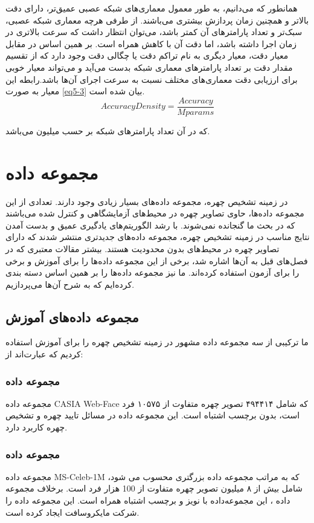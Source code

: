 \noindent
همانطور که می‌دانیم، به طور معمول معماری‌های شبکه عصبی عمیق‌تر، دارای دقت بالاتر و همچنین زمان پردازش بیشتری می‌باشند. از طرفی هرچه معماری شبکه عصبی، سبک‌تر و تعداد پارامترهای آن کمتر باشد، می‌توان انتظار داشت که سرعت بالاتری در زمان اجرا داشته باشد، اما دقت آن با کاهش همراه است. بر همین اساس در مقابل معیار دقت، معیار دیگری به نام تراکم دقت یا چگالی دقت  وجود دارد که از تقسیم مقدار دقت بر تعداد پارامترهای معماری شبکه بدست می‌آید و می‌تواند معیار خوبی برای ارزیابی دقت معماری‌های مختلف نسبت به سرعت اجرای آن‌ها باشد.رابطه این معیار به صورت \ref{eq5-3} بیان شده است.
‌\begin{equation}\label{eq5-3}
Accuracy Density = \frac{Accuracy}{Mparams}
\end{equation}

\noindent
که در آن  تعداد پارامترهای شبکه بر حسب میلیون می‌باشد.

\section{مجموعه داده}
در زمینه تشخیص چهره، مجموعه داده‌های بسیار زیادی وجود دارند. تعدادی از این مجموعه داده‌ها، حاوی تصاویر چهره در محیط‌های آزمایشگاهی و کنترل شده می‌باشند که در بحث ما گنجانده نمی‌شوند. با رشد الگوریتم‌های یادگیری عمیق و بدست آمدن نتایج مناسب در زمینه تشخیص چهره، مجموعه داده‌های جدیدتری منتشر شدند که دارای تصاویر چهره در محیط‌های بدون محدودیت هستند. بیشتر مقالات معتبری که در فصل‌های قبل به آن‌ها اشاره شد، برخی از این مجموعه داده‌ها را برای آموزش و برخی را برای آزمون استفاده کرده‌اند. ما نیز مجموعه داده‌ها را بر همین اساس دسته بندی کرده‌ایم که به شرح آن‌ها می‌پردازیم.

\subsection{مجموعه داده‌های آموزش}
ما ترکیبی از سه مجموعه داده مشهور در زمینه تشخیص چهره را برای آموزش استفاده کردیم که عبارت‌اند از:

\subsubsection{مجموعه داده }
مجموعه داده CASIA Web-Face که شامل ۴۹۴۴۱۴ تصویر چهره متفاوت از ۱۰۵۷۵ فرد است، بدون برچسب اشتباه است. این مجموعه داده در مسائل تایید چهره و تشخیص چهره کاربرد دارد. \cite{CASIA_dataset}

\subsubsection{مجموعه داده }
مجموعه داده MS-Celeb-1M  که به مراتب مجموعه داده بزرگتری محسوب می شود، شامل بیش از ۸ میلیون تصویر چهره متفاوت از 100 هزار فرد است. برخلاف مجموعه داده ، این مجموعه‌داده با نویز و برچسب اشتباه همراه است. این مجموعه داده را شرکت مایکروسافت ایجاد کرده است. \cite{MS_Celeb_dataset}

